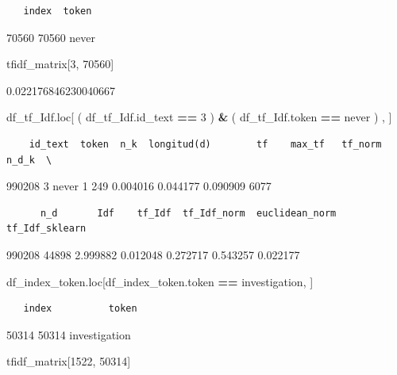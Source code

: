 \documentclass[
  11pt,
  a4paper,
]{article}
\newenvironment{Shaded}{\begin{snugshade}}{\end{snugshade}}
\newcommand{\DecValTok}[1]{\textcolor[rgb]{0.00,0.00,0.81}{#1}}
\newcommand{\NormalTok}[1]{#1}
\newcommand{\OperatorTok}[1]{\textcolor[rgb]{0.81,0.36,0.00}{\textbf{#1}}}
\newcommand{\StringTok}[1]{\textcolor[rgb]{0.31,0.60,0.02}{#1}}
\begin{document}
\begin{verbatim}
   index  token
\end{verbatim}

70560 70560 never

\begin{Shaded}
\begin{Highlighting}[]
\NormalTok{tfidf\_matrix[}\DecValTok{3}\NormalTok{, }\DecValTok{70560}\NormalTok{]}
\end{Highlighting}
\end{Shaded}

0.022176846230040667

\begin{Shaded}
\begin{Highlighting}[]
\NormalTok{df\_tf\_Idf.loc[ ( df\_tf\_Idf.id\_text }\OperatorTok{==} \DecValTok{3}\NormalTok{ ) }\OperatorTok{\&}\NormalTok{  ( df\_tf\_Idf.token }\OperatorTok{==} \StringTok{\textquotesingle{}never\textquotesingle{}}\NormalTok{ ) , ]}
\end{Highlighting}
\end{Shaded}

\begin{verbatim}
    id_text  token  n_k  longitud(d)        tf    max_tf   tf_norm  n_d_k  \
\end{verbatim}

990208 3 never 1 249 0.004016 0.044177 0.090909 6077

\begin{verbatim}
      n_d       Idf    tf_Idf  tf_Idf_norm  euclidean_norm  tf_Idf_sklearn  
\end{verbatim}

990208 44898 2.999882 0.012048 0.272717 0.543257 0.022177

\begin{Shaded}
\begin{Highlighting}[]
\NormalTok{df\_index\_token.loc[df\_index\_token.token }\OperatorTok{==} \StringTok{\textquotesingle{}investigation\textquotesingle{}}\NormalTok{, ]}
\end{Highlighting}
\end{Shaded}

\begin{verbatim}
   index          token
\end{verbatim}

50314 50314 investigation

\begin{Shaded}
\begin{Highlighting}[]
\NormalTok{tfidf\_matrix[}\DecValTok{1522}\NormalTok{, }\DecValTok{50314}\NormalTok{]}
\end{Highlighting}
\end{Shaded}
\end{document}
